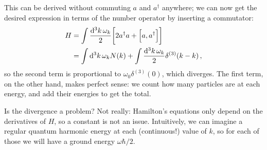\documentclass[main.tex]{subfiles}
\begin{document}
This can be derived without commuting \(a\) and \(a ^\dag\) anywhere; we can now get the desired expression in terms of the number operator by inserting a commutator: 
%
\begin{subequations}
\begin{align}
H &= \int \frac{ \dd[3]{k} \omega_{k} }{2} \qty[2 a ^\dag a + \qty[a, a ^\dag]]   \\
&= \int \dd[3]{k} \omega_{k} N(k) + \int \frac{ \dd[3]{k} \omega_{k}}{2} \delta^{(3)} (k - k)
\,,
\end{align}
\end{subequations}
%
so the second term is proportional to \(\omega_{0} \delta^{(3)} (0)\), which diverges. 
The first term, on the other hand, makes perfect sense: we count how many particles are at each energy, and add their energies to get the total. 

Is the divergence a problem? Not really: Hamilton's equations only depend on the derivatives of \(H\), so a constant is not an issue. 
Intuitively, we can imagine a regular quantum harmonic energy at each (continuous!) value of \(k\), so for each of those we will have a ground energy \( \omega \hbar /2\). 
\end{document}
